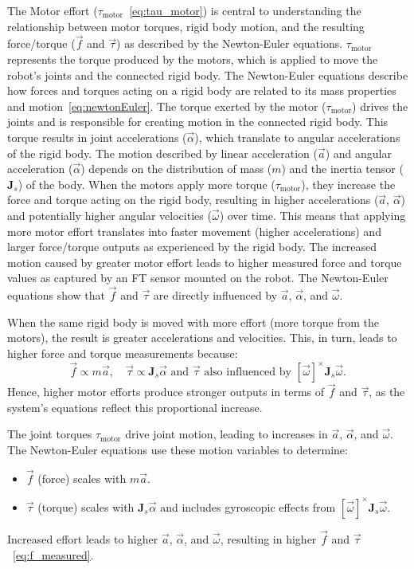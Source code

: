     The Motor effort (\(\tau_{\text{motor}}\)~\eqref{eq:tau_motor}) is central to understanding the relationship between motor torques, rigid body motion, and the resulting force/torque (\(\vec{f}\) and \(\vec{\tau}\)) as described by the Newton-Euler equations. \(\tau_{\text{motor}}\) represents the torque produced by the motors, which is applied to move the robot's joints and the connected rigid body. The Newton-Euler equations describe how forces and torques acting on a rigid body are related to its mass properties and motion~\eqref{eq:newtonEuler}. The torque exerted by the motor (\(\tau_{\text{motor}}\)) drives the joints and is responsible for creating motion in the connected rigid body. This torque results in joint accelerations (\(\vec{\alpha}\)), which translate to angular accelerations of the rigid body. The motion described by linear acceleration (\(\vec{a}\)) and angular acceleration (\(\vec{\alpha}\)) depends on the distribution of mass (\(m\)) and the inertia tensor (\(\mathbf{J}_s\)) of the body. When the motors apply more torque (\(\tau_{\text{motor}}\)), they increase the force and torque acting on the rigid body, resulting in higher accelerations (\(\vec{a}\), \(\vec{\alpha}\)) and potentially higher angular velocities (\(\vec{\omega}\)) over time. This means that applying more motor effort translates into faster movement (higher accelerations) and larger force/torque outputs as experienced by the rigid body. The increased motion caused by greater motor effort leads to higher measured force and torque values as captured by an FT sensor mounted on the robot. The Newton-Euler equations show that \(\vec{f}\) and \(\vec{\tau}\) are directly influenced by \(\vec{a}\), \(\vec{\alpha}\), and \(\vec{\omega}\).
    
    When the same rigid body is moved with more effort (more torque from the motors), the result is greater accelerations and velocities. This, in turn, leads to higher force and torque measurements because:
    \begin{equation}
    \vec{f} \propto m\vec{a}, \quad \vec{\tau} \propto \mathbf{J}_s \vec{\alpha} \text{ and } \vec{\tau} \text{ also influenced by } [\vec{\omega}]^{\times} \mathbf{J}_s \vec{\omega}.
    \label{eq:f_proportional}
    \end{equation}
    Hence, higher motor efforts produce stronger outputs in terms of \(\vec{f}\) and \(\vec{\tau}\), as the system's equations reflect this proportional increase.
    
    The joint torques \(\tau_{\text{motor}}\) drive joint motion, leading to increases in \(\vec{a}\), \(\vec{\alpha}\), and \(\vec{\omega}\). The Newton-Euler equations use these motion variables to determine:
    \begin{itemize}
        \item \(\vec{f}\) (force) scales with \(m\vec{a}\).
        \item \(\vec{\tau}\) (torque) scales with \(\mathbf{J}_s \vec{\alpha}\) and includes gyroscopic effects from \([\vec{\omega}]^{\times} \mathbf{J}_s \vec{\omega}\).
    \end{itemize}
    
    Increased effort leads to higher \(\vec{a}\), \(\vec{\alpha}\), and \(\vec{\omega}\), resulting in higher \(\vec{f}\) and \(\vec{\tau}\)~\eqref{eq:f_measured}.    